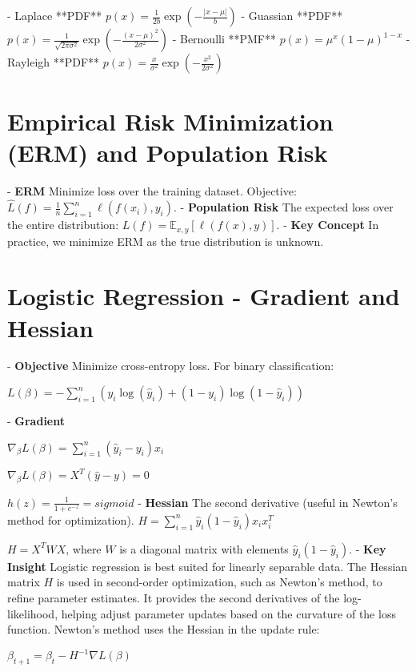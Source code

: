 \documentclass[10pt]{article}
\begin{document}
\begin{multicols}{2}
- Laplace **PDF** $p(x) = \frac{1}{2b} \exp\left(-\frac{|x-\mu|}{b}\right)$
- Guassian **PDF** $p(x) = \frac{1}{\sqrt{2\pi\sigma^2}} \exp\left(-\frac{(x-\mu)^2}{2\sigma^2}\right)$
- Bernoulli **PMF** $p(x) = \mu^x(1-\mu)^{1-x}$
- Rayleigh **PDF** $p(x) = \frac{x}{\sigma^2} \exp\left(-\frac{x^2}{2\sigma^2}\right)$




\section*{Empirical Risk Minimization (ERM) and Population Risk}
- \textbf{ERM} Minimize loss over the training dataset. Objective: $\hat{L}(f) = \frac{1}{n} \sum_{i=1}^{n} \ell(f(x_i), y_i)$.
- \textbf{Population Risk} The expected loss over the entire distribution: $L(f) = \mathbb{E}_{x,y}[\ell(f(x), y)]$.
- \textbf{Key Concept} In practice, we minimize ERM as the true distribution is unknown.

\section*{Logistic Regression - Gradient and Hessian}
- \textbf{Objective} Minimize cross-entropy loss. For binary classification:
  
  $L(\beta) = - \sum_{i=1}^{n} \left( y_i \log(\hat{y}_i) + (1 - y_i) \log(1 - \hat{y}_i) \right)$
  
- \textbf{Gradient} 
  
  $\nabla_{\beta} L(\beta) = \sum_{i=1}^{n} \left( \hat{y}_i - y_i \right) x_i$
  
  $\nabla_{\beta} L(\beta) = X^T (\hat{y} - y) = 0$

  $h(z) = \frac{1}{1 + e^{-z}} = sigmoid$
- \textbf{Hessian} The second derivative (useful in Newton’s method for optimization).
  $H = \sum_{i=1}^{n} \hat{y}_i (1 - \hat{y}_i) x_i x_i^T$
  
  $H = X^T W X$, where $W$ is a diagonal matrix with elements $\hat{y}_i(1 - \hat{y}_i)$.
- \textbf{Key Insight} Logistic regression is best suited for linearly separable data. The Hessian matrix \( H \) is used in second-order optimization, such as Newton’s method, to refine parameter estimates. It provides the second derivatives of the log-likelihood, helping adjust parameter updates based on the curvature of the loss function.
Newton's method uses the Hessian in the update rule:

$\beta_{t+1} = \beta_t - H^{-1} \nabla L(\beta)$


\end{multicols}
\end{document}
